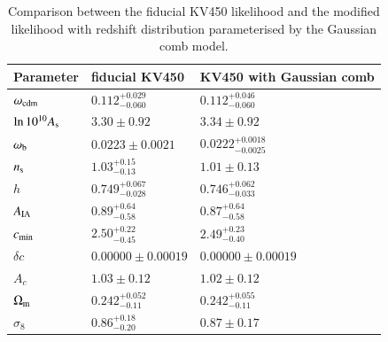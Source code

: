 \documentclass{aa}
\begin{document}
\begin{appendix}
\begin{table}
\caption{Comparison between the fiducial KV450 likelihood and the modified likelihood with redshift distribution parameterised by the Gaussian comb model.}
\begin{tabular}{lll}
\hline
\hline
Parameter & fiducial KV450 & KV450 with Gaussian comb\\
\hline
$\omega_{\rm cdm }  $ & $0.112^{+0.029}_{-0.060}   $& $0.112^{+0.046}_{-0.060}   $\\

$\ln10^{10}A_{\rm s}$ & $3.30\pm 0.92              $& $3.34\pm 0.92              $\\

$\omega_{\rm b}    $ & $0.0223\pm 0.0021          $& $0.0222^{+0.0018}_{-0.0025}$\\

$n_{\rm s}         $ & $1.03^{+0.15}_{-0.13}      $& $1.01\pm 0.13              $\\

$h              $ & $0.749^{+0.067}_{-0.028}   $& $0.746^{+0.062}_{-0.033}   $\\
\hline
$A_{\rm IA}        $ & $0.89^{+0.64}_{-0.58}      $& $0.87^{+0.64}_{-0.58}              $\\

$c_{\rm min}       $ & $2.50^{+0.22}_{-0.45}      $& $2.49^{+0.23}_{-0.40}     $\\

$\delta c             $ & $0.00000\pm 0.00019        $& $0.00000\pm 0.00019        $\\

$A_c             $ & $1.03\pm 0.12              $& $1.02\pm 0.12              $\\

$\Omega_{\rm m}    $ & $0.242^{+0.052}_{-0.11}    $& $0.242^{+0.055}_{-0.11}    $\\

$\sigma_8        $ & $0.86^{+0.18}_{-0.20}      $& $0.87\pm 0.17      $\\
\hline
\end{tabular}
\label{tab:consistency}
\end{table}


\end{appendix}
\end{document}
